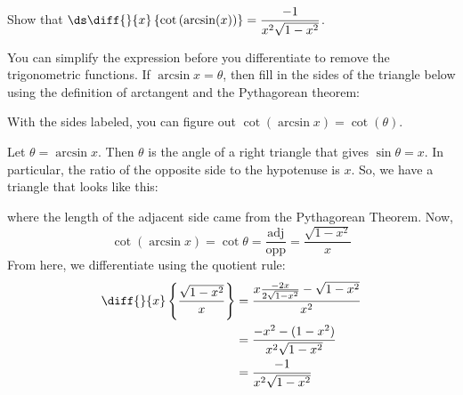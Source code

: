 \begin{question}
Show that $\ds\diff{}{x}\left\{\cot\left(\arcsin(x)
\right)\right\} = \dfrac{-1}{x^2\sqrt{1-x^2}}$.
\end{question}
\begin{hint}
You can simplify the expression before you differentiate to remove the trigonometric functions. If $\arcsin x =\theta$, then fill in the sides of the triangle below using the definition of arctangent and the Pythagorean theorem:
\begin{center}\end{center}
With the sides labeled, you can figure out $\cot\left(\arcsin x\right)=\cot\left(\theta\right)$.
\end{hint}
\begin{answer}
Let $\theta = \arcsin x$. Then $\theta$ is the angle of a right triangle that gives $\sin \theta = x$. In particular, the ratio of the opposite side to the hypotenuse is $x$. So, we have a  triangle that looks like this:
\begin{center}\end{center}
where the length of the adjacent side came from the Pythagorean Theorem. Now,
\[\cot\left(\arcsin x\right) = \cot \theta = \frac{\mbox{adj}}{\mbox{opp}} = \frac{\sqrt{1-x^2}}{x}\]
From here, we differentiate using the quotient rule:
\begin{align*}
\diff{}{x}\left\{\frac{\sqrt{1-x^2}}{x}
\right\}&=
\frac{x\frac{-2x}{2\sqrt{1-x^2}}-\sqrt{1-x^2}}{x^2}\\
&=\frac{-x^2-(1-x^2)}{x^2\sqrt{1-x^2}}\\
&=\frac{-1}{x^2\sqrt{1-x^2}}
\end{align*}\end{answer}
